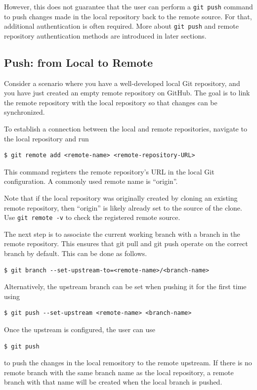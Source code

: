 However, this does not guarantee that the user can perform a \verb|git push| command to push changes made in the local repository back to the remote source. For that, additional authentication is often required. More about \verb|git push| and remote repository authentication methods are introduced in later sections.

\subsection{Push: from Local to Remote}

Consider a scenario where you have a well-developed local Git repository, and you have just created an empty remote repository on GitHub. The goal is to link the remote repository with the local repository so that changes can be synchronized.

To establish a connection between the local and remote repositories, navigate to the local repository and run
\begin{lstlisting}
$ git remote add <remote-name> <remote-repository-URL>
\end{lstlisting}
This command registers the remote repository's URL in the local Git configuration. A commonly used remote name is ``origin''.

Note that if the local repository was originally created by cloning an existing remote repository, then ``origin'' is likely already set to the source of the clone. Use \verb|git remote -v| to check the registered remote source.

The next step is to associate the current working branch with a branch in the remote repository. This ensures that git pull and git push operate on the correct branch by default. This can be done as follows.
\begin{lstlisting}
$ git branch --set-upstream-to=<remote-name>/<branch-name>
\end{lstlisting}
Alternatively, the upstream branch can be set when pushing it for the first time using
\begin{lstlisting}
$ git push --set-upstream <remote-name> <branch-name>
\end{lstlisting}

Once the upstream is configured, the user can use 
\begin{lstlisting}
$ git push
\end{lstlisting}
to push the changes in the local remository to the remote upstream. If there is no remote branch with the same branch name as the local repository, a remote branch with that name will be created when the local branch is pushed.

